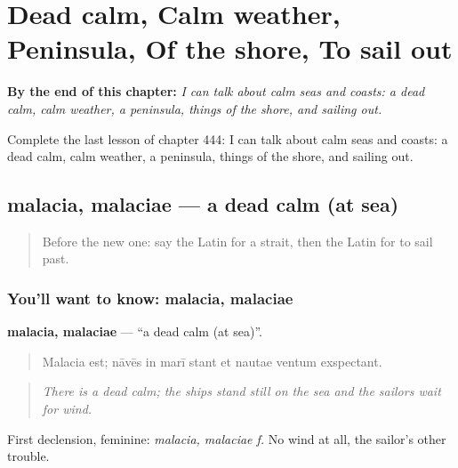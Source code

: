 
\chapter{Dead calm, Calm weather, Peninsula, Of the shore, To sail out}
\label{ch:la-dead-calm-calm-weather-peninsula-of-the-shore-to-sail-out}

\begin{chapteropening}
\textbf{By the end of this chapter:} \emph{I can talk about calm seas and coasts: a dead calm, calm weather, a peninsula, things of the shore, and sailing out.}

Complete the last lesson of chapter 444: I can talk about calm seas and coasts: a dead calm, calm weather, a peninsula, things of the shore, and sailing out.
\end{chapteropening}

\section[malacia, malaciae]{malacia, malaciae — a dead calm (at sea)}

\label{lesson:LA-C444-malacia}



\begin{quote}
Before the new one: say the Latin for a strait, then the Latin for to sail past.
\end{quote}

\subsection*{You'll want to know: malacia, malaciae}
\textbf{malacia, malaciae} — \textquotedblleft{}a dead calm (at sea)\textquotedblright{}.

\begin{quote}
Malacia est; nāvēs in marī stant et nautae ventum exspectant.
\end{quote}

\begin{quote}
\emph{There is a dead calm; the ships stand still on the sea and the sailors wait for wind.}
\end{quote}

First declension, feminine: \emph{malacia, malaciae f.} No wind at all, the sailor's other trouble.


